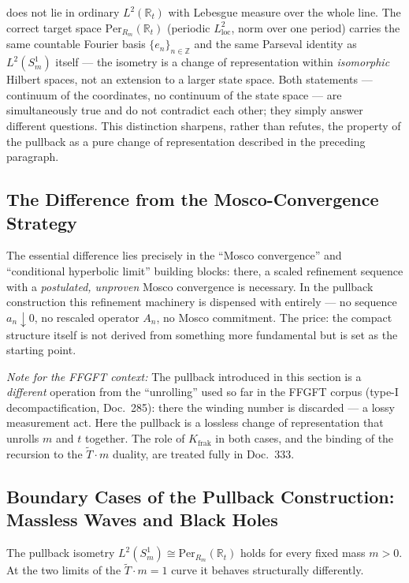 \begin{kernbox}[title={Refinement: two different meanings of ``continuum''}]
does not lie in ordinary $L^2(\mathbb{R}_t)$ with Lebesgue measure over
the whole line. The correct target space $\mathrm{Per}_{R_m}(\mathbb{R}_t)$
(periodic $L^2_\mathrm{loc}$, norm over one period) carries the same
countable Fourier basis $\{e_n\}_{n\in\mathbb{Z}}$ and the same Parseval
identity as $L^2(S^1_m)$ itself --- the isometry is a change of
representation within \emph{isomorphic} Hilbert spaces, not an extension
to a larger state space. Both statements --- continuum of the
coordinates, no continuum of the state space --- are simultaneously true
and do not contradict each other; they simply answer different
questions. This distinction sharpens, rather than refutes, the property
of the pullback as a pure change of representation described in the
preceding paragraph.
\end{kernbox}

\subsection{The Difference from the Mosco-Convergence Strategy}

The essential difference lies precisely in the ``Mosco convergence'' and
``conditional hyperbolic limit'' building blocks: there, a scaled
refinement sequence with a \emph{postulated, unproven} Mosco convergence
is necessary. In the pullback construction this refinement machinery is
dispensed with entirely — no sequence $a_n\downarrow0$, no rescaled
operator $A_n$, no Mosco commitment. The price: the compact structure
itself is not derived from something more fundamental but is set as the
starting point.

\emph{Note for the FFGFT context:} The pullback introduced in this
section is a \emph{different} operation from the ``unrolling'' used
so far in the FFGFT corpus (type-I decompactification, Doc.~285):
there the winding number is discarded — a lossy measurement act.
Here the pullback is a lossless change of representation that unrolls
$m$ and $t$ together. The role of $K_{\text{frak}}$ in both cases,
and the binding of the recursion to the $\tilde{T}\cdot m$ duality,
are treated fully in Doc.~333.

\subsection{Boundary Cases of the Pullback Construction: Massless Waves and Black Holes}

The pullback isometry
$L^2(S^1_m)\cong\mathrm{Per}_{R_m}(\mathbb{R}_t)$ holds for every
fixed mass $m>0$. At the two limits of the $\tilde{T}\cdot m=1$
curve it behaves structurally differently.

